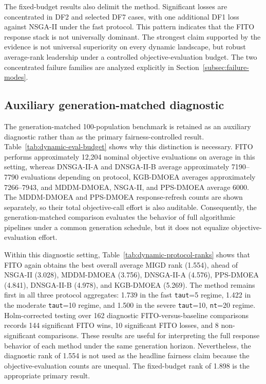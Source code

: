 \documentclass[preprint,12pt]{elsarticle}
\begin{document}
The fixed-budget results also delimit the method. Significant losses are concentrated in DF2 and selected DF7 cases, with one additional DF1 loss against NSGA-II under the fast protocol. This pattern indicates that the FITO response stack is not universally dominant. The strongest claim supported by the evidence is not universal superiority on every dynamic landscape, but robust average-rank leadership under a controlled objective-evaluation budget. The two concentrated failure families are analyzed explicitly in Section~\ref{subsec:failure-modes}.

\subsection{Auxiliary generation-matched diagnostic}
\label{subsec:generation-matched-diagnostic}



The generation-matched 100-population benchmark is retained as an auxiliary diagnostic rather than as the primary fairness-controlled result. Table~\ref{tab:dynamic-eval-budget} shows why this distinction is necessary. FITO performs approximately 12,204 nominal objective evaluations on average in this setting, whereas DNSGA-II-A and DNSGA-II-B average approximately 7190--7790 evaluations depending on protocol, KGB-DMOEA averages approximately 7266--7943, and MDDM-DMOEA, NSGA-II, and PPS-DMOEA average 6000. The MDDM-DMOEA and PPS-DMOEA response-refresh counts are shown separately, so their total objective-call effort is also auditable. Consequently, the generation-matched comparison evaluates the behavior of full algorithmic pipelines under a common generation schedule, but it does not equalize objective-evaluation effort.

Within this diagnostic setting, Table~\ref{tab:dynamic-protocol-ranks} shows that FITO again obtains the best overall average MIGD rank (1.554), ahead of NSGA-II (3.028), MDDM-DMOEA (3.756), DNSGA-II-A (4.576), PPS-DMOEA (4.841), DNSGA-II-B (4.978), and KGB-DMOEA (5.269). The method remains first in all three protocol aggregates: 1.739 in the fast \texttt{taut}=5 regime, 1.422 in the moderate \texttt{taut}=10 regime, and 1.500 in the severe \texttt{taut}=10, \texttt{nt}=20 regime. Holm-corrected testing over 162 diagnostic FITO-versus-baseline comparisons records 144 significant FITO wins, 10 significant FITO losses, and 8 non-significant comparisons. These results are useful for interpreting the full response behavior of each method under the same generation horizon. Nevertheless, the diagnostic rank of 1.554 is not used as the headline fairness claim because the objective-evaluation counts are unequal. The fixed-budget rank of 1.898 is the appropriate primary result.
\end{document}
